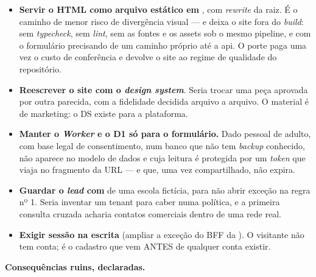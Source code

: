 \begin{itemize}
  \item \textbf{Servir o HTML como arquivo estático em }, com
    \emph{rewrite} da raiz. É o caminho de menor risco de divergência visual ---
    e deixa o site fora do \emph{build}: sem \emph{typecheck}, sem \emph{lint},
    sem as fontes e os assets sob o mesmo pipeline, e com o formulário
    precisando de um caminho próprio até a api. O porte paga uma vez o custo de
    conferência e devolve o site ao regime de qualidade do repositório.
  \item \textbf{Reescrever o site com o \emph{design system}}. Seria trocar uma
    peça aprovada por outra parecida, com a fidelidade decidida arquivo a
    arquivo. O material é de marketing: o DS existe para a plataforma.
  \item \textbf{Manter o \emph{Worker} e o D1 só para o formulário.} Dado pessoal
    de adulto, com base legal de consentimento, num banco que não tem
    \emph{backup} conhecido, não aparece no modelo de dados e cuja leitura é
    protegida por um \emph{token} que viaja no fragmento da URL --- e que, uma
    vez compartilhado, não expira.
  \item \textbf{Guardar o \emph{lead} com } de uma escola fictícia,
    para não abrir exceção na regra nº 1. Seria inventar um tenant para caber
    numa política, e a primeira consulta cruzada acharia contatos comerciais
    dentro de uma rede real.
  \item \textbf{Exigir sessão na escrita} (ampliar a exceção do BFF da
    ). O visitante não tem conta; é o cadastro que vem ANTES de
    qualquer conta existir.
\end{itemize}

\textbf{Consequências ruins, declaradas.}

